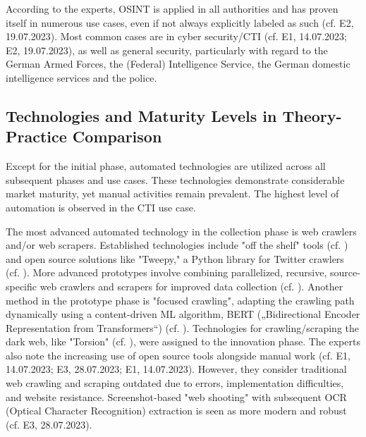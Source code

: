 \documentclass[10pt]{article}
\begin{document}
According to the experts, OSINT is applied in all authorities and has proven itself
in numerous use cases, even if not always explicitly labeled as such (cf. E2, 19.07.2023).
Most common cases are in cyber security/CTI (cf. E1, 14.07.2023; E2, 19.07.2023), as well as general security,
particularly with regard to the German Armed Forces, the (Federal) Intelligence Service,
the Ger­man do­mes­tic in­tel­li­gence ser­vices and the police.

\subsection{Technologies and Maturity Levels in Theory-Practice Comparison}

Except for the initial phase, automated technologies are utilized across all subsequent phases and use cases.
These technologies demonstrate considerable market maturity, yet manual activities remain prevalent.
The highest level of automation is observed in the CTI use case.

The most advanced automated technology in the collection phase is web crawlers and/or web scrapers.
Established technologies include "off the shelf" tools (cf. \cite{Middleton.2020}) and open source
solutions like "Tweepy," a Python library for Twitter crawlers (cf. \cite{Adewopo.2020,Tekin.2021}).
More advanced prototypes involve combining parallelized, recursive, source-specific web crawlers and scrapers for improved
data collection (cf. \cite{Jenkins.2021,Rajendran.2022}). Another method in the prototype phase is
"focused crawling", adapting the crawling path dynamically using a content-driven ML algorithm, BERT („Bidirectional Encoder Representation from Transformers“)
(cf. \cite{Kuehn.2023}). Technologies for crawling/scraping the dark web, like "Torsion" (cf. \cite{Sonawane.2022}),
were assigned to the innovation phase. The experts also note the increasing use of open source tools alongside manual work
(cf. E1, 14.07.2023; E3, 28.07.2023; E1, 14.07.2023). However, they consider traditional web crawling and scraping
outdated due to errors, implementation difficulties, and website resistance. Screenshot-based "web shooting" with
subsequent OCR (Optical Character Recognition) extraction is seen as more modern and robust (cf. E3, 28.07.2023).
\end{document}
